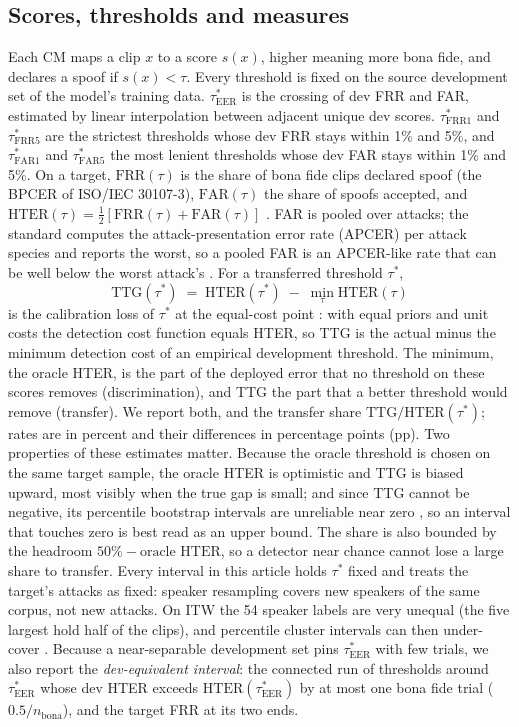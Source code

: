 \documentclass[review,authoryear]{elsarticle}
\newcommand{\ttg}{\mathrm{TTG}}
\newcommand{\hter}{\mathrm{HTER}}
\newcommand{\frr}{\mathrm{FRR}}
\newcommand{\far}{\mathrm{FAR}}
\newcommand{\tauE}{\tau^{*}_{\mathrm{EER}}}
\newcommand{\tauF}[1]{\tau^{*}_{\mathrm{FRR}#1}}
\newcommand{\tauA}[1]{\tau^{*}_{\mathrm{FAR}#1}}
\begin{document}
\subsection{Scores, thresholds and measures}
Each CM maps a clip \(x\) to a score \(s(x)\), higher meaning more bona fide, and declares a spoof if \(s(x)<\tau\). Every
threshold is fixed on the source development set of the model's training data. \(\tauE\) is the crossing of dev FRR and
FAR, estimated by linear interpolation between adjacent unique dev scores. \(\tauF{1}\) and \(\tauF{5}\) are the strictest
thresholds whose dev FRR stays within 1\% and 5\%, and \(\tauA{1}\) and \(\tauA{5}\) the most lenient thresholds whose dev
FAR stays within 1\% and 5\%. On a target, \(\frr(\tau)\) is the share of bona fide clips declared spoof (the BPCER of
ISO/IEC 30107-3), \(\far(\tau)\) the share of spoofs accepted, and \(\hter(\tau)=\tfrac12[\frr(\tau)+\far(\tau)]\)
\citep{bengio04_hter}. FAR is pooled over attacks; the standard computes the attack-presentation error rate (APCER) per
attack species and reports the worst, so a pooled FAR is an APCER-like rate that can be well below the worst attack's
\citep{iso30107_3}. For a transferred threshold \(\tau^{*}\),
\begin{equation}
\ttg(\tau^{*}) \;=\; \hter(\tau^{*}) \;-\; \min_{\tau}\hter(\tau)
\label{eq:ttg}
\end{equation}
is the calibration loss of \(\tau^{*}\) at the equal-cost point \citep{brummer06_calibration,vanleeuwen07_intro}: with
equal priors and unit costs the detection cost function equals HTER, so TTG is the actual minus the minimum detection
cost of an empirical development threshold. The minimum, the oracle HTER, is the part of the deployed error that no
threshold on these scores removes (discrimination), and TTG the part that a better threshold would remove (transfer).
We report both, and the transfer share \(\ttg/\hter(\tau^{*})\); rates are in percent and their differences in percentage
points (pp). Two properties of these estimates matter. Because the
oracle threshold is chosen on the same target sample, the oracle HTER is optimistic and TTG is biased upward, most
visibly when the true gap is small; and since TTG cannot be negative, its percentile bootstrap intervals are unreliable
near zero \citep{andrews00_boundary}, so an interval that touches zero is best read as an upper bound. The share is also
bounded by the headroom \(50\% - \text{oracle HTER}\), so a detector near chance cannot lose a large share to transfer.
Every interval in this article holds \(\tau^{*}\) fixed and treats the target's attacks as fixed: speaker resampling
covers new speakers of the same corpus, not new attacks. On ITW the 54 speaker labels are very unequal (the five largest
hold half of the clips), and percentile cluster intervals can then under-cover \citep{mackinnon17_wild}.
Because a near-separable development set pins \(\tauE\) with few trials, we also report the \emph{dev-equivalent
interval}: the connected run of thresholds around \(\tauE\) whose dev HTER exceeds \(\hter(\tauE)\) by at most one bona
fide trial (\(0.5/n_{\mathrm{bona}}\)), and the target FRR at its two ends.
\end{document}
